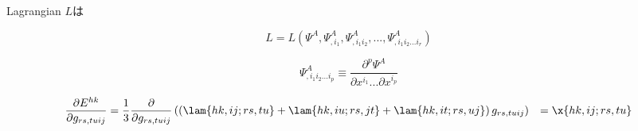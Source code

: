 \documentclass[dvipdfmx,a4]{jsarticle}
\title{}
\author{中越一磨}
\begin{document}
\maketitle

\section{}
Lagrangian \(L\)は

\begin{equation}
  L=L(\Psi ^A, \Psi ^A _{,i_1}, \Psi ^A _{,i_1 i_2}, ... , \Psi ^A _{,i_1 i_2 ... i_r})
\end{equation} 

\begin{equation}
  \Psi ^A _{,i_1 i_2 ... i_p} \equiv  \dfrac{\partial ^p \Psi^A}{\partial x^{i_1} ...\partial x^{i_p}}
\end{equation}

\begin{align*}
  \dfrac{\partial E^{hk}}{\partial g_{rs,tuij} } 
  &=\dfrac{1}{3}
  \dfrac{\partial }{\partial g_{rs,tuij}  }\left( \left( \lam{hk,ij;rs,tu} + \lam{hk,iu;rs,jt} + \lam{hk,it;rs,uj} \right)g_{rs,tuij}\right)
  &=\x{hk,ij;rs,tu}
\end{align*}
\begin{thebibliography}{9}
\end{thebibliography}
\end{document}
